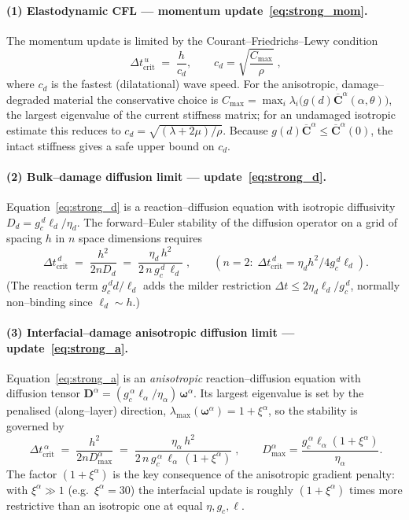 \documentclass[12pt,a4paper]{article}
\newcommand{\bomega}{\boldsymbol{\omega}}
\newcommand{\Ca}{\overline{\mathbf{C}}^{\alpha}}     %
\newcommand{\Dt}{\Delta t}
\begin{document}
	\paragraph{(1) Elastodynamic CFL --- momentum update~\eqref{eq:strong_mom}.}
	The momentum update is limited by the Courant--Friedrichs--Lewy condition
	\begin{equation}\label{eq:cfl_u}
		\boxed{\;\Dt^{\,u}_{\mathrm{crit}} \;=\; \frac{h}{c_d},
		\qquad c_d=\sqrt{\frac{C_{\max}}{\rho}}\;,}
	\end{equation}
	where $c_d$ is the fastest (dilatational) wave speed. For the anisotropic,
	damage--degraded material the conservative choice is
	$C_{\max}=\max_i\lambda_i\!\bigl(g(d)\Ca(\alpha,\theta)\bigr)$, the largest
	eigenvalue of the current stiffness matrix; for an undamaged isotropic estimate
	this reduces to $c_d=\sqrt{(\lambda+2\mu)/\rho}$. Because $g(d)\Ca\le\Ca(0)$, the
	intact stiffness gives a safe upper bound on $c_d$.

	\paragraph{(2) Bulk--damage diffusion limit --- update~\eqref{eq:strong_d}.}
	Equation~\eqref{eq:strong_d} is a reaction--diffusion equation with isotropic
	diffusivity $D_d=g_c^{\,d}\ell_d/\eta_d$. The forward--Euler stability of the
	diffusion operator on a grid of spacing $h$ in $n$ space dimensions requires
	\begin{equation}\label{eq:cfl_d}
		\boxed{\;\Dt^{\,d}_{\mathrm{crit}} \;=\; \frac{h^2}{2nD_d}
		\;=\; \frac{\eta_d\,h^2}{2\,n\,g_c^{\,d}\,\ell_d}\;,}
		\qquad (n=2:\;\Dt^{\,d}_{\mathrm{crit}}=\eta_d h^2/4g_c^{\,d}\ell_d).
	\end{equation}
	(The reaction term $g_c^{\,d}d/\ell_d$ adds the milder restriction
	$\Dt\le2\eta_d\ell_d/g_c^{\,d}$, normally non--binding since $\ell_d\sim h$.)

	\paragraph{(3) Interfacial--damage anisotropic diffusion limit --- update~\eqref{eq:strong_a}.}
	Equation~\eqref{eq:strong_a} is an \emph{anisotropic} reaction--diffusion
	equation with diffusion tensor
	$\mathbf{D}^{\alpha}=(g_c^{\,\alpha}\ell_\alpha/\eta_\alpha)\,\bomega^{\alpha}$.
	Its largest eigenvalue is set by the penalised (along--layer) direction,
	$\lambda_{\max}(\bomega^{\alpha})=1+\xi^{\alpha}$, so the stability is governed by
	\begin{equation}\label{eq:cfl_a}
		\boxed{\;\Dt^{\,\alpha}_{\mathrm{crit}} \;=\; \frac{h^2}{2nD^{\alpha}_{\max}}
		\;=\; \frac{\eta_\alpha\,h^2}{2\,n\,g_c^{\,\alpha}\,\ell_\alpha\,(1+\xi^{\alpha})}\;,}
		\qquad D^{\alpha}_{\max}=\frac{g_c^{\,\alpha}\ell_\alpha(1+\xi^{\alpha})}{\eta_\alpha}.
	\end{equation}
	The factor $(1+\xi^{\alpha})$ is the key consequence of the anisotropic gradient
	penalty: with $\xi^{\alpha}\gg1$ (e.g.\ $\xi^{\alpha}=30$) the interfacial
	update is roughly $(1+\xi^{\alpha})$ times more restrictive than an isotropic one
	at equal $\eta,g_c,\ell$.
\end{document}

